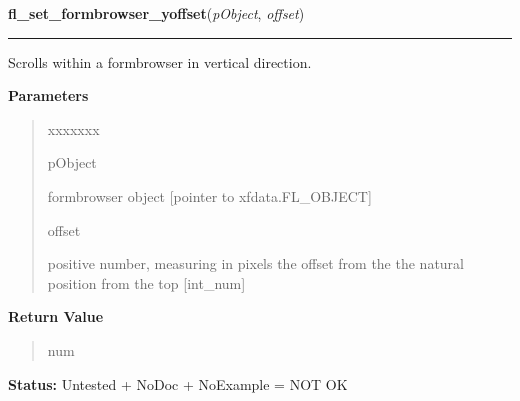 \hspace{.8\funcindent}\begin{boxedminipage}{\funcwidth}

    \raggedright \textbf{fl\_set\_formbrowser\_yoffset}(\textit{pObject}, \textit{offset})

    \vspace{-1.5ex}

    \rule{\textwidth}{0.5\fboxrule}
\setlength{\parskip}{2ex}
    Scrolls within a formbrowser in vertical direction.

\setlength{\parskip}{1ex}
      \textbf{Parameters}
      \vspace{-1ex}

      \begin{quote}
        \begin{Ventry}{xxxxxxx}

          \item[pObject]

          formbrowser object [pointer to xfdata.FL\_OBJECT]

          \item[offset]

          positive number, measuring in pixels the offset from the the 
          natural position from the top [int\_num]

        \end{Ventry}

      \end{quote}

      \textbf{Return Value}
    \vspace{-1ex}

      \begin{quote}
      num

      \end{quote}

\textbf{Status:} Untested + NoDoc + NoExample = NOT OK



    \end{boxedminipage}

    \label{xformslib:library:fl_get_formbrowser_xoffset}

    \vspace{0.5ex}

